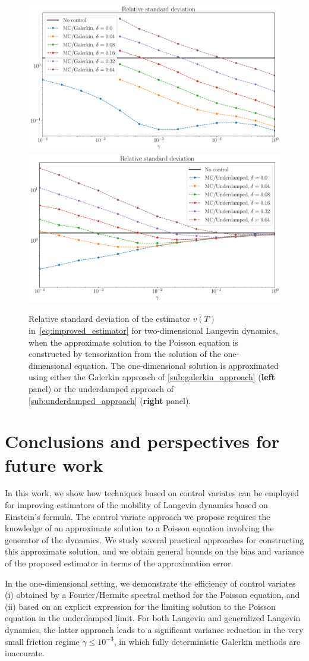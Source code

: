 \documentclass[11pt,a4paper]{article}
\begin{document}
\begin{figure}[ht]
    \centering
    \includegraphics[width=0.49\linewidth]{figures/var-delta-galerkin.pdf}
    \includegraphics[width=0.49\linewidth]{figures/var-delta-underdamped.pdf}
    \caption{
        Relative standard deviation of the estimator $v(T)$ in~\eqref{eq:improved_estimator} for two-dimensional Langevin dynamics,
        when the approximate solution to the Poisson equation is constructed by tensorization from the solution of the one-dimensional equation.
        The one-dimensional solution is approximated using either the Galerkin approach of \cref{sub:galerkin_approach} (\textbf{left} panel)
        or the underdamped approach of \cref{sub:underdamped_approach} (\textbf{right} panel).
    }%
    \label{fig:time_bias_deviation_2d}
\end{figure}

\section{Conclusions and perspectives for future work}%
\label{sec:conclusions_and_perspectives_for_future_work}
In this work,
we show how techniques based on control variates can be employed for improving estimators of the mobility of Langevin dynamics based on Einstein's formula.
The control variate approach we propose requires the knowledge of an approximate solution to a Poisson equation involving the generator of the dynamics.
We study several practical approaches for constructing this approximate solution,
and we obtain general bounds on the bias and variance of the proposed estimator in terms of the approximation error.

In the one-dimensional setting,
we demonstrate the efficiency of control variates
(i) obtained by a Fourier/Hermite spectral method for the Poisson equation, and
(ii) based on an explicit expression for the limiting solution to the Poisson equation in the underdamped limit.
For both Langevin and generalized Langevin dynamics,
the latter approach leads to a significant variance reduction in the very small friction regime $\gamma \leq 10^{-3}$,
in which fully deterministic Galerkin methods are inaccurate.
\end{document}

